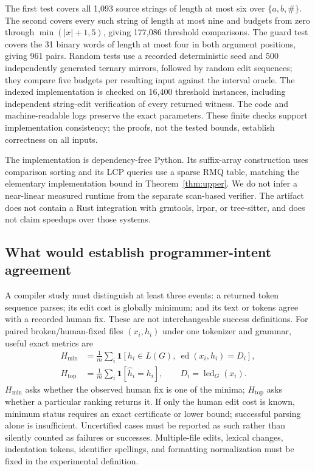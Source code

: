 \documentclass[sigconf,screen]{acmart}
\newcommand{\ED}{\operatorname{ed}}
\newcommand{\LED}{\operatorname{led}}
\newcommand{\ind}[1]{\mathbf 1[#1]}
\theoremstyle{definition}
\begin{document}
The first test covers all 1,093 source strings of length at most six over $\{a,b,\#\}$. The second covers every such string of length at most nine and budgets from zero through $\min(|x|+1,5)$, giving 177,086 threshold comparisons. The guard test covers the 31 binary words of length at most four in both argument positions, giving 961 pairs. Random tests use a recorded deterministic seed and 500 independently generated ternary mirrors, followed by random edit sequences; they compare five budgets per resulting input against the interval oracle. The indexed implementation is checked on 16,400 threshold instances, including independent string-edit verification of every returned witness. The code and machine-readable logs preserve the exact parameters. These finite checks support implementation consistency; the proofs, not the tested bounds, establish correctness on all inputs.

The implementation is dependency-free Python. Its suffix-array construction uses comparison sorting and its LCP queries use a sparse RMQ table, matching the elementary implementation bound in Theorem~\ref{thm:upper}. We do not infer a near-linear measured runtime from the separate scan-based verifier. The artifact does not contain a Rust integration with grmtools, lrpar, or tree-sitter, and does not claim speedups over those systems.

\subsection{What would establish programmer-intent agreement}
A compiler study must distinguish at least three events: a returned token sequence parses; its edit cost is globally minimum; and its text or tokens agree with a recorded human fix. These are not interchangeable success definitions. For paired broken/human-fixed files $(x_i,h_i)$ under one tokenizer and grammar, useful exact metrics are
\begin{align*}
 H_{\mathrm{min}}&=\frac{1}{m}\sum_i\ind{h_i\in L(G),\ \ED(x_i,h_i)=D_i},\\
 H_{\mathrm{top}}&=\frac{1}{m}\sum_i\ind{\widehat h_i=h_i},
 \qquad D_i=\LED_G(x_i).
\end{align*}
$H_{\mathrm{min}}$ asks whether the observed human fix is one of the minima; $H_{\mathrm{top}}$ asks whether a particular ranking returns it. If only the human edit cost is known, minimum status requires an exact certificate or lower bound; successful parsing alone is insufficient. Uncertified cases must be reported as such rather than silently counted as failures or successes. Multiple-file edits, lexical changes, indentation tokens, identifier spellings, and formatting normalization must be fixed in the experimental definition.
\end{document}
